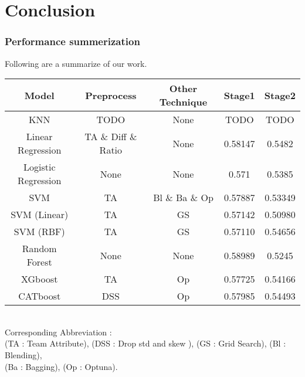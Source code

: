 \section{Conclusion}
\subsubsection*{Performance summerization}
Following are a summarize of our work.
\begin{table}[h]
    \centering
    \begin{tabular}{|c|c|c|c|c|}
    \hline
    Model & Preprocess & Other Technique & Stage1 & Stage2 \\ \hline\hline
    KNN   & TODO   & None & TODO & TODO  \\ \hline
    Linear Regression & TA \& Diff \& Ratio & None & 0.58147 & 0.5482 \\ \hline
    Logistic Regression & None & None & 0.571 & 0.5385 \\ \hline
    SVM & TA & Bl \& Ba \& Op & 0.57887 & 0.53349 \\ \hline
    SVM (Linear) & TA & GS & 0.57142 & 0.50980 \\ \hline
    SVM (RBF) & TA & GS & 0.57110 & 0.54656 \\ \hline
    Random Forest & None & None & 0.58989 & 0.5245 \\ \hline
    XGboost & TA & Op & 0.57725 & 0.54166 \\ \hline
    CATboost & DSS & Op & 0.57985 & 0.54493 \\ \hline
    \end{tabular}
    \label{tab:example_table}
\end{table}\\
Corresponding Abbreviation : \\
(TA : Team Attribute), (DSS : Drop std and skew ), (GS : Grid Search), (Bl : Blending),\\
 (Ba : Bagging), (Op : Optuna).

